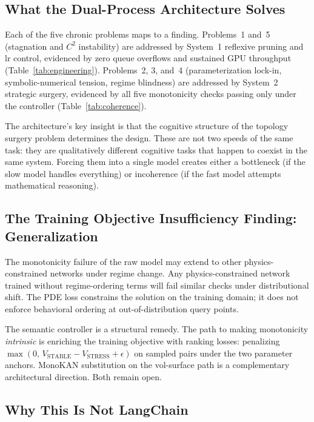 \documentclass[11pt,a4paper]{article}
\begin{document}
\subsection{What the Dual-Process Architecture Solves}
\label{sec:discussion:solves}

Each of the five chronic problems maps to a finding. Problems~1 and~5 (stagnation
and $C^2$ instability) are addressed by System~1 reflexive pruning and lr control,
evidenced by zero queue overflows and sustained GPU throughput (Table~\ref{tab:engineering}).
Problems~2, 3, and~4 (parameterization lock-in, symbolic-numerical tension, regime
blindness) are addressed by System~2 strategic surgery, evidenced by all five
monotonicity checks passing only under the controller (Table~\ref{tab:coherence}).

The architecture's key insight is that the cognitive structure of the topology surgery
problem determines the design. These are not two speeds of the same task: they are
qualitatively different cognitive tasks that happen to coexist in the same system.
Forcing them into a single model creates either a bottleneck (if the slow model
handles everything) or incoherence (if the fast model attempts mathematical reasoning).

\subsection{The Training Objective Insufficiency Finding: Generalization}
\label{sec:discussion:generalization}

The monotonicity failure of the raw model may extend to other physics-constrained
networks under regime change. Any physics-constrained network
trained without regime-ordering terms will fail similar checks under distributional
shift. The PDE loss constrains the solution on the training domain; it does not
enforce behavioral ordering at out-of-distribution query points.

The semantic controller is a structural remedy. The path to making monotonicity
\emph{intrinsic} is enriching the training objective with ranking losses: penalizing
$\max(0,\, V_\text{STABLE} - V_\text{STRESS} + \epsilon)$ on sampled pairs under
the two parameter anchors. MonoKAN \citep{polo_molina_etal_2024_monokan} substitution
on the vol-surface path is a complementary architectural direction. Both remain open.

\subsection{Why This Is Not LangChain}
\label{sec:discussion:notlangchain}
\end{document}
